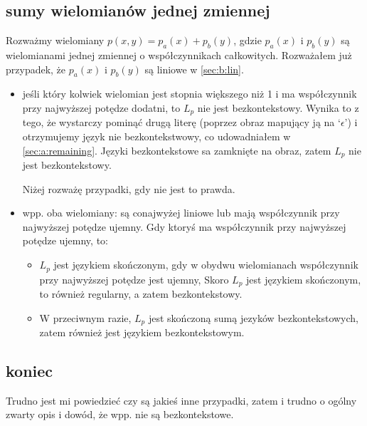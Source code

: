 \documentclass{article}
\theoremstyle{definition}
\theoremstyle{remark}
\begin{document}
\subsection{sumy wielomianów jednej zmiennej}

Rozważmy wielomiany \(p(x,y) = p_a(x) + p_b(y)\), gdzie \(p_a(x)\) i \(p_b(y)\) są wielomianami jednej zmiennej o współczynnikach całkowitych.
Rozważałem już przypadek, że \(p_a(x)\) i \(p_b(y)\) są liniowe w \ref{sec:b:lin}.

\begin{itemize}
    \item jeśli który kolwiek wielomian jest stopnia większego niż 1 i ma współczynnik przy najwyższej potędze dodatni,
    to \(L_p\) nie jest bezkontekstowy. Wynika to z tego, że wystarczy pominąć drugą literę (poprzez obraz mapujący ją na `$\epsilon$')
    i otrzymujemy język nie bezkontekstwowy, co udowadniałem w \ref{sec:a:remaining}. Języki bezkontekstowe sa zamknięte na obraz,
    zatem \(L_p\) nie jest bezkontekstowy.

    Niżej rozważę przypadki, gdy nie jest to prawda.
    
    \item wpp. oba wielomiany: są conajwyżej liniowe lub mają współczynnik przy najwyższej potędze ujemny.
    Gdy ktoryś ma współczynnik przy najwyższej potędze ujemny, to:
    \begin{itemize}
        \item \(L_p\) jest językiem skończonym, gdy w obydwu wielomianach współczynnik przy najwyższej potędze jest ujemny,
        Skoro \(L_p\) jest językiem skończonym, to również regularny, a zatem bezkontekstowy.
        \item W przeciwnym razie, \(L_p\) jest skończoną sumą jezyków bezkontekstowych,
        zatem również jest językiem bezkontekstowym.
    \end{itemize}
\end{itemize}

\subsection{koniec}

Trudno jest mi powiedzieć czy są jakieś inne przypadki, zatem i trudno o ogólny zwarty opis i dowód, że wpp. nie są bezkontekstowe.
\end{document}
